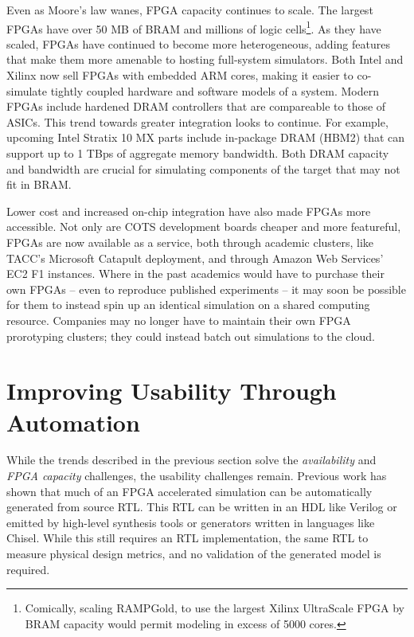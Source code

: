 Even as Moore's law wanes, FPGA capacity continues to scale. The largest FPGAs
have over 50 MB of BRAM and millions of logic cells\footnote{Comically, scaling
RAMPGold\cite{rampgold}, to use the largest Xilinx UltraScale
FPGA\cite{ultrascale} by BRAM capacity would permit modeling in excess of 5000
cores.}. As they have scaled, FPGAs have continued to become more
heterogeneous, adding features that make them more amenable to hosting
full-system simulators.  Both Intel and Xilinx now sell FPGAs with embedded ARM
cores, making it easier to co-simulate tightly coupled hardware and software
models of a system. Modern FPGAs include hardened DRAM controllers that are
compareable to those of ASICs. This trend towards greater integration looks to
continue. For example, upcoming Intel Stratix 10 MX parts include in-package DRAM (HBM2)
that can support up to 1 TBps of aggregate memory bandwidth\cite{stratix10mx}.
Both DRAM capacity and bandwidth are crucial for simulating components
of the target that may not fit in BRAM.

Lower cost and increased on-chip integration have also made FPGAs more
accessible. Not only are COTS development boards cheaper and more featureful,
FPGAs are now available as a service, both through academic clusters, like
TACC's Microsoft Catapult\cite{catapultannounce} deployment, and through Amazon
Web Services' EC2 F1 instances\cite{amazonf1}. Where in the past academics
would have to purchase their own FPGAs -- even to reproduce published
experiments -- it may soon be possible for them to instead spin up an identical
simulation on a shared computing resource. Companies may no longer have to
maintain their own FPGA prorotyping clusters; they could instead batch out
simulations to the cloud.

\section{Improving Usability Through Automation}

While the trends described in the previous section solve the
\emph{availability} and \emph{FPGA capacity} challenges, the usability
challenges remain. Previous work\cite{fabscalarfpga, strober} has shown that
much of an FPGA accelerated simulation can be automatically generated from
source RTL. This RTL can be written in an HDL like Verilog or emitted by
high-level synthesis tools or generators written in languages like
Chisel\cite{chisel}. While this still requires an RTL implementation, the same
RTL to measure physical design metrics, and no validation of the generated
model is required.

